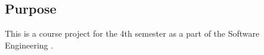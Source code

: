 \subsection{Purpose}

This is a course project for the 4th semester as a part of the Software Engineering . 
